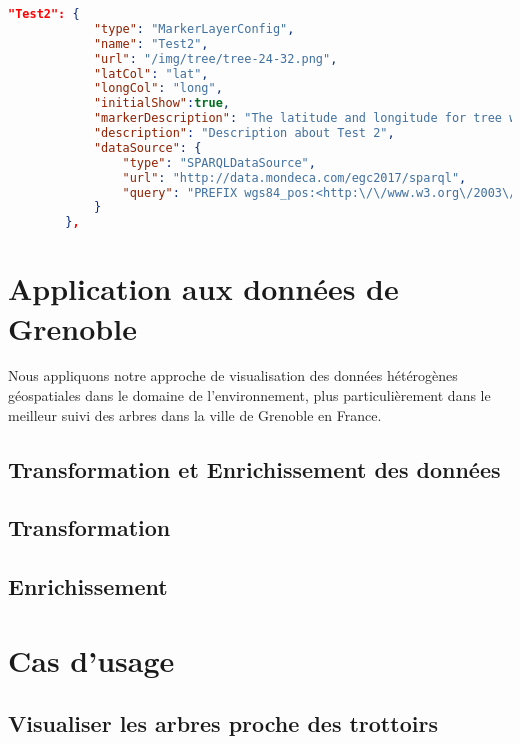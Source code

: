 \documentclass[a4paper,pagenum,french,showlayout]{rnti}
\begin{document}
 \begin{lstlisting}[basicstyle=\tiny,float=htb,caption={Exemple de la configuration pour un SPARQL endpoint. },label=list:alignment, language=json]
   "Test2": {
			"type": "MarkerLayerConfig",
			"name": "Test2",
			"url": "/img/tree/tree-24-32.png",
			"latCol": "lat",
			"longCol": "long",
			"initialShow":true,
			"markerDescription": "The latitude and longitude for tree with <code> is <lat> and <long> respectively",
			"description": "Description about Test 2",
			"dataSource": {
				"type": "SPARQLDataSource",
				"url": "http://data.mondeca.com/egc2017/sparql",
				"query": "PREFIX wgs84_pos:<http:\/\/www.w3.org\/2003\/01\/geo\/wgs84_pos#>\r\nPREFIX rdf: <http:\/\/www.w3.org\/1999\/02\/22-rdf-syntax-ns#>\r\nSELECT ?lat ?long ?code\r\nWHERE {\r\n  ?subject rdf:type <http:\/\/linkedgeodata.org\/ontology\/Tree>;\r\n\t\t wgs84_pos:lat ?lat;\r\n\t\t wgs84_pos:long ?long;\r\n\t\t <http:\/\/data.lof.com\/def\/tonto#code> ?code\r\n}\r\nLIMIT 25"
			}
		},

	\end{lstlisting}
	
\section{Application aux données de Grenoble}
Nous appliquons notre approche de visualisation des données hétérogènes géospatiales dans le domaine de l’environnement, plus particulièrement dans le meilleur suivi des arbres dans la ville de Grenoble en France. 

\subsection{Transformation et Enrichissement des données}

\subsection{Transformation}

\subsection{Enrichissement}


\section{Cas d'usage}

\subsection{Visualiser les arbres proche des trottoirs}
\end{document}
